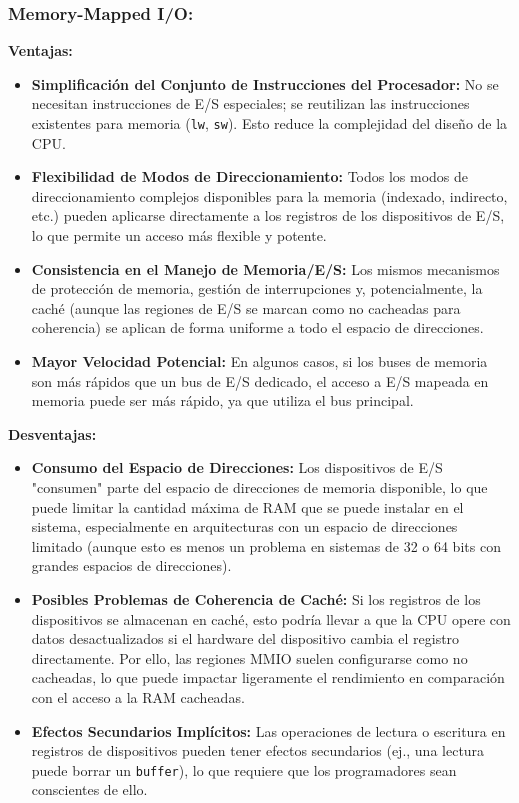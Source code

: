 \documentclass[12pt, a4paper]{article}
\begin{document}
\subsubsection*{Memory-Mapped I/O:}
\textbf{Ventajas:}
\begin{itemize}
    \item \textbf{Simplificación del Conjunto de Instrucciones del Procesador:} No se necesitan instrucciones de E/S especiales; se reutilizan las instrucciones existentes para memoria (\texttt{lw}, \texttt{sw}). Esto reduce la complejidad del diseño de la CPU.
    \item \textbf{Flexibilidad de Modos de Direccionamiento:} Todos los modos de direccionamiento complejos disponibles para la memoria (indexado, indirecto, etc.) pueden aplicarse directamente a los registros de los dispositivos de E/S, lo que permite un acceso más flexible y potente.
    \item \textbf{Consistencia en el Manejo de Memoria/E/S:} Los mismos mecanismos de protección de memoria, gestión de interrupciones y, potencialmente, la caché (aunque las regiones de E/S se marcan como no cacheadas para coherencia) se aplican de forma uniforme a todo el espacio de direcciones.
    \item \textbf{Mayor Velocidad Potencial:} En algunos casos, si los buses de memoria son más rápidos que un bus de E/S dedicado, el acceso a E/S mapeada en memoria puede ser más rápido, ya que utiliza el bus principal.
\end{itemize}
\textbf{Desventajas:}
\begin{itemize}
    \item \textbf{Consumo del Espacio de Direcciones:} Los dispositivos de E/S "consumen" parte del espacio de direcciones de memoria disponible, lo que puede limitar la cantidad máxima de RAM que se puede instalar en el sistema, especialmente en arquitecturas con un espacio de direcciones limitado (aunque esto es menos un problema en sistemas de 32 o 64 bits con grandes espacios de direcciones).
    \item \textbf{Posibles Problemas de Coherencia de Caché:} Si los registros de los dispositivos se almacenan en caché, esto podría llevar a que la CPU opere con datos desactualizados si el hardware del dispositivo cambia el registro directamente. Por ello, las regiones MMIO suelen configurarse como no cacheadas, lo que puede impactar ligeramente el rendimiento en comparación con el acceso a la RAM cacheadas.
    \item \textbf{Efectos Secundarios Implícitos:} Las operaciones de lectura o escritura en registros de dispositivos pueden tener efectos secundarios (ej., una lectura puede borrar un \texttt{buffer}), lo que requiere que los programadores sean conscientes de ello.
\end{itemize}
\end{document}
